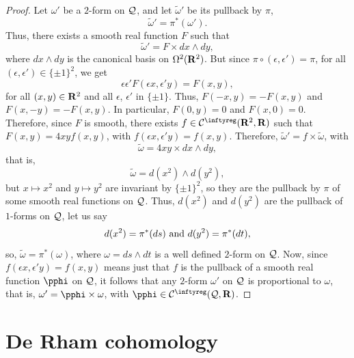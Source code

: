 \begin{proof}
  Let $\omega'$ be a $2$-form on $\mathcal{Q}$,
  and let $\tilde \omega'$ be its pullback by $\pi$,
  $$%
    \tilde \omega' = \pi^*(\omega').
  $$%
  Thus,
  there exists a smooth real function $F$ such that
  $$%
    \tilde \omega' = F \times dx \wedge dy,
  $$%
  where $dx \wedge dy$ is the canonical basis on $\Omega^2(\mathbf{R}^2)$.
  But since $\pi \circ (\epsilon,\epsilon') = \pi$,
  for all $(\epsilon,\epsilon') \in \{\pm 1\}^2$,
  we get
  $$%
    \epsilon \epsilon' F(\epsilon x,\epsilon' y) = F(x,y),
  $$%
  for all $(x,y) \in \mathbf{R}^2$ and all $\epsilon$,
  $\epsilon'$ in $\{\pm1\}$.
  Thus,
  $F(-x,y) = -F(x,y)$ and $F(x,-y) = -F(x,y)$.
  In particular,
  $F(0,y) = 0$ and $F(x,0) = 0$.
  Therefore,
  since $F$ is smooth,
  there exists $f \in \Cinfty(\RR^2,\RR)$ such that $F(x,y) = 4xyf(x,y)$,
  with $f(\epsilon x, \epsilon' y) = f(x,y)$.
  Therefore,
  $\tilde \omega' = f \times \tilde \omega$,
  with
  $$%
    \tilde \omega = 4xy \times dx \wedge dy,
  $$%
  that is,
  $$%
    \tilde\omega = d(x^2) \wedge d(y^2),
  $$%
  but $x\mapsto x^2$ and $y \mapsto y^2$ are invariant by $\{\pm1\}^2$,
  so they are the pullback by $\pi$ of some smooth real functions on $\mathcal{Q}$.
  Thus,
  $d(x^2)$ and $d(y^2)$ are the pullback of $1$-forms on $\mathcal{Q}$,
  let us say
  $$%
    d(x^2) = \pi^*(ds)
    \SpacedText{and}
    d(y^2) = \pi^*(dt),
  $$%
  so,
  $\tilde \omega = \pi^*(\omega)$,
  where $\omega = ds \wedge dt$ is a well defined $2$-form on $\mathcal{Q}$.
  Now,
  since $f(\epsilon x, \epsilon'y) = f(x,y)$ means just that $f$ is the pullback of a smooth real function $\pphi$ on $\mathcal{Q}$,
  it follows that any $2$-form $\omega'$ on $\mathcal{Q}$ is proportional to $\omega$,
  that is,
  $\omega' = \pphi \times \omega$,
  with $\pphi \in \Cinfty(\cQ,\RR)$.
\end{proof}

\section{De Rham cohomology}

